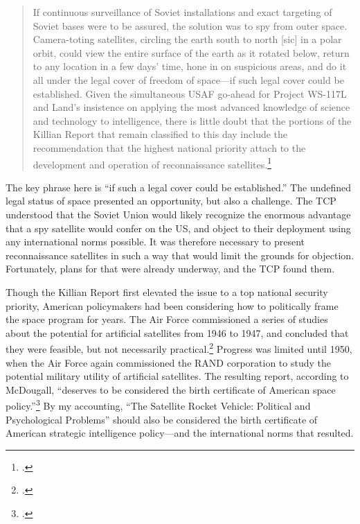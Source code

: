 \documentclass{memoir}
\begin{document}
\begin{quote}
	If continuous surveillance of Soviet installations and exact targeting of Soviet bases were to be assured, the solution was to spy from outer space. Camera-toting satellites, circling the earth south to north [sic] in a polar orbit, could view the entire surface of the earth as it rotated below, return to any location in a few days' time, hone in on suspicious areas, and do it all under the legal cover of freedom of space---if such legal cover could be established. Given the simultaneous USAF go-ahead for Project WS-117L and Land's insistence on applying the most advanced knowledge of science and technology to intelligence, there is little doubt that the portions of the Killian Report that remain classified to this day include the recommendation that the highest national priority attach to the development and operation of reconnaissance satellites.\footcite[p.~117]{mcdougall_heavens_1985}
\end{quote}
The key phrase here is ``if such a legal cover could be established.'' The undefined legal status of space presented an opportunity, but also a challenge. The TCP understood that the Soviet Union would likely recognize the enormous advantage that a spy satellite would confer on the US, and object to their deployment using any international norms possible.  It was therefore necessary to present reconnaissance satellites in such a way that would limit the grounds for objection. Fortunately, plans for that were already underway, and the TCP found them.

Though the Killian Report first elevated the issue to a top national security priority, American policymakers had been considering how to politically frame the space program for years. The Air Force commissioned a series of studies about the potential for artificial satellites from 1946 to 1947, and concluded that they were feasible, but not necessarily practical.\footcite[p.~5-6]{peebles_corona_1997} Progress was limited until 1950, when  the Air Force again commissioned the RAND corporation to study the potential military utility of artificial satellites. The resulting report, according to McDougall, ``deserves to be considered the birth certificate of American space policy.''\footcite[p.~108]{mcdougall_heavens_1985} By my accounting, ``The Satellite Rocket Vehicle: Political and Psychological Problems'' should also be considered the birth certificate of American strategic intelligence policy---and the international norms that resulted.
\end{document}
